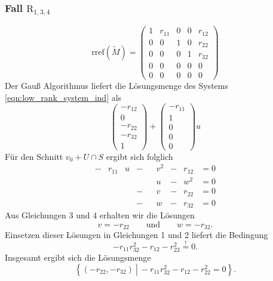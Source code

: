 \documentclass[a4paper,oneside, 11pt, openany%
]{article}
\theoremstyle{custom}
\theoremstyle{custom}
\begin{document}
\subsubsection*{Fall $\text{R}_{1,3,4}$}
\begin{equation*}\label{eqn:rref_r134}
	\text{rref}(\tilde{M}) =
	\left( \begin{array}{ccccc}
		1&r_{11}&0&0&r_{12}\\
		0&0&1&0&r_{22}\\
		0&0&0&1&r_{32}\\
		0&0&0&0&0\\
		0&0&0&0&0
	\end{array}\right)
\end{equation*}
Der Gauß Algorithmus liefert die Lösungsmenge des Systems \eqref{eqn:low_rank_system_ind} als
\begin{equation*}
	\begin{pmatrix}
		-r_{12}\\
		0\\
		-r_{22}\\
		-r_{32}\\
		1
	\end{pmatrix} +
	\begin{pmatrix}
		-r_{11}\\
		1\\
		0\\
		0\\
		0
	\end{pmatrix}u
\end{equation*}
Für den Schnitt $v_0 + U \cap S $ ergibt sich folglich
\begin{equation*}
	\begin{alignedat}{8}
		-&r_{11}&u&-&&v^2&-&r_{12}&=0\\
		&&&&&u&-&w^2&=0\\
		&&&-&&v&-&r_{22}&=0\\
		&&&-&&w&-&r_{32}&=0
	\end{alignedat}
\end{equation*}
Aus Gleichungen 3 und 4 erhalten wir die Lösungen
\begin{equation}
	v = -r_{22} \qquad \text{und} \qquad w=-r_{32}.
\end{equation}
Einsetzen dieser Lösungen in Gleichungen 1 und 2 liefert die Bedingung
\begin{equation}
	-r_{11}r_{32}^2-r_{12}-r_{22}^2\overset{!}{=}0.
\end{equation}
Insgesamt ergibt sich die Lösungsmenge
\begin{equation*}
	\left\lbrace (-r_{22},-r_{32}) \ \left| \ -r_{11}r_{32}^2-r_{12}-r_{22}^2=0 \right.\right\rbrace .
\end{equation*}
\end{document}
